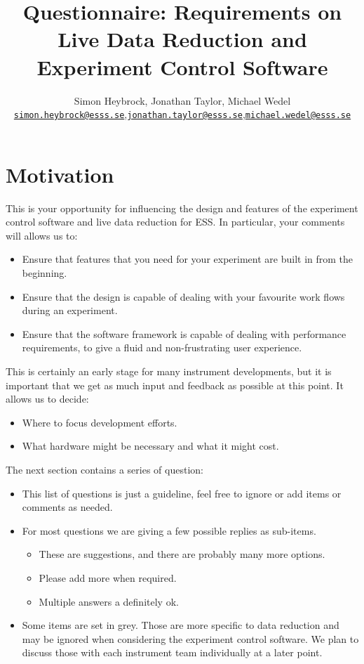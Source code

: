 \documentclass[a4paper,english,numbers=noenddot,bibliography=totoc,chapterprefix=on,DIV=12]{scrartcl}
\begin{document}
\title{Questionnaire: Requirements on Live Data Reduction and Experiment Control Software}
\author{Simon Heybrock, Jonathan Taylor, Michael Wedel\\
    {\small\href{mailto:simon.heybrock@esss.se}{\nolinkurl{simon.heybrock@esss.se}}},{\small\href{mailto:jonathan.taylor@esss.se}{\nolinkurl{jonathan.taylor@esss.se}}},{\small\href{mailto:michael.wedel@esss.se}{\nolinkurl{michael.wedel@esss.se}}}}

\maketitle



\section{Motivation}

This is your opportunity for influencing the design and features of the experiment control software and live data reduction for ESS.
In particular, your comments will allows us to:
\begin{itemize}
  \item Ensure that features that you need for your experiment are built in from the beginning.
  \item Ensure that the design is capable of dealing with your favourite work flows during an experiment.
  \item Ensure that the software framework is capable of dealing with performance requirements, to give a fluid and non-frustrating user experience.
\end{itemize}
This is certainly an early stage for many instrument developments, but it is important that we get as much input and feedback as possible at this point.
It allows us to decide:
\begin{itemize}
  \item Where to focus development efforts.
  \item What hardware might be necessary and what it might cost.
\end{itemize}
The next section contains a series of question:
\begin{itemize}
  \item This list of questions is just a guideline, feel free to ignore or add items or comments as needed.
  \item For most questions we are giving a few possible replies as sub-items.
    \begin{itemize}
      \item These are suggestions, and there are probably many more options.
      \item Please add more when required.
      \item Multiple answers a definitely ok.
    \end{itemize}
  \item Some items are set in {\color{black!60} grey}.
    Those are more specific to data reduction and may be ignored when considering the experiment control software.
    We plan to discuss those with each instrument team individually at a later point.
\end{itemize}
\end{document}
